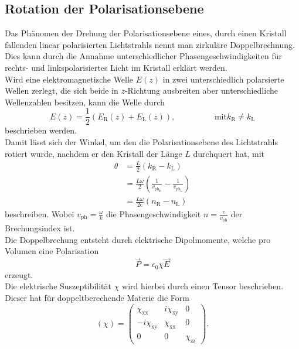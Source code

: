  \subsection{Rotation der Polarisationsebene}
  Das Phänomen der Drehung der Polarisationsebene eines, durch einen Kristall fallenden linear
  polarisierten Lichtstrahls nennt man
  zirkuläre Doppelbrechnung.\\
  Dies kann durch die Annahme unterschiedlicher Phasengeschwindigkeiten für rechts- und
   linkspolarisiertes Licht im Kristall erklärt werden.\\
  Wird eine elektromagnetische Welle $E(z)$ in zwei unterschiedlich polarsierte Wellen zerlegt, die sich beide in $z$-Richtung
  ausbreiten aber unterschiedliche Wellenzahlen besitzen, kann die Welle durch
  \begin{equation}
    E(z)=\frac{1}{2}\left(E_{\text{R}}(z)+E_\text{{L}}(z)\right), \hspace{2cm}\text{mit} k_{\text{R}} \neq  k_{\text{L}}
    \label{eq:Wellezerlegt}
  \end{equation}
  beschrieben werden.\\
  Damit lässt sich der Winkel, um den die Polarisationsebene des Lichtstrahls rotiert wurde,
  nachdem er den Kristall der Länge $L$ durchquert hat, mit
  \begin{align}
    \theta &=\frac{L}{2} \left(k_{\text{R}}-k_{\text{L}}\right)\\
          &=\frac{L\omega}{2}\left(\frac{1}{v_{\text{ph}_{\text{R}}}}-\frac{1}{v_{\text{ph}_{\text{L}}}}\right)\\
          &=\frac{L\omega}{2\text{c}}\left(n_{\text{R}}-n_{\text{L}}\right)
  \end{align}
  beschreiben. Wobei $v_{\text{ph}}=\frac{\omega}{k}$ die Phasengeschwindigkeit $n=\frac{c}{v_{\text{ph}}}$ der Brechungsindex ist.\\
  Die Doppelbrechung entsteht durch elektrische Dipolmomente, welche pro Volumen eine Polarisation
  \begin{equation}
    \vec{P}=\epsilon_0 \chi \vec{E}
  \end{equation}
  erzeugt.\\
  Die elektrische Suszeptibilität $\chi$ wird hierbei durch einen Tensor beschrieben.
  Dieser hat für doppeltberechende Materie die Form
  \begin{equation}
    \left( \chi \right)=
    \begin{pmatrix}
      \chi_{\text{xx}} & i\chi_{\text{xy}} & 0 \\
      -i \chi_{\text{xy}}& \chi_{\text{xx}} & 0 \\
      0& 0 & \chi_{\text{zz}}
      \end{pmatrix} .
    \end{equation}
